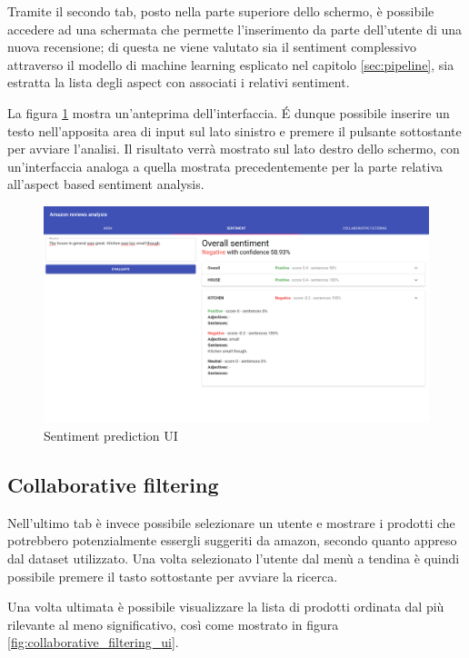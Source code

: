 \documentclass[hidelinks, 12pt]{article}
\begin{document}
Tramite il secondo tab, posto nella parte superiore dello schermo, è possibile accedere ad una schermata che permette l'inserimento da parte dell'utente di una nuova recensione; di questa ne viene valutato sia il sentiment complessivo attraverso il modello di machine learning esplicato nel capitolo \ref{sec:pipeline}, sia estratta la lista degli aspect con associati i relativi sentiment.

La figura \ref{fig:sentiment_ui_prediction} mostra un'anteprima dell'interfaccia. \'E dunque possibile inserire un testo nell'apposita area di input sul lato sinistro e premere il pulsante sottostante per avviare l'analisi. Il risultato verrà mostrato sul lato destro dello schermo, con un'interfaccia analoga a quella mostrata precedentemente per la parte relativa all'aspect based sentiment analysis.

\begin{figure}[H]
	\centering
	\includegraphics[scale=0.35]{images/08_03_sentiment_ui_prediction.png}
	\caption[Sentiment prediction UI]{Sentiment prediction UI}
	\label{fig:sentiment_ui_prediction}
\end{figure}


\clearpage


\subsection{Collaborative filtering}

Nell'ultimo tab è invece possibile selezionare un utente e mostrare i prodotti che potrebbero potenzialmente essergli suggeriti da amazon, secondo quanto appreso dal dataset utilizzato. Una volta selezionato l'utente dal menù a tendina è quindi possibile premere il tasto sottostante per avviare la ricerca.

Una volta ultimata è possibile visualizzare la lista di prodotti ordinata dal più rilevante al meno significativo, così come mostrato in figura \ref{fig:collaborative_filtering_ui}.
\end{document}
